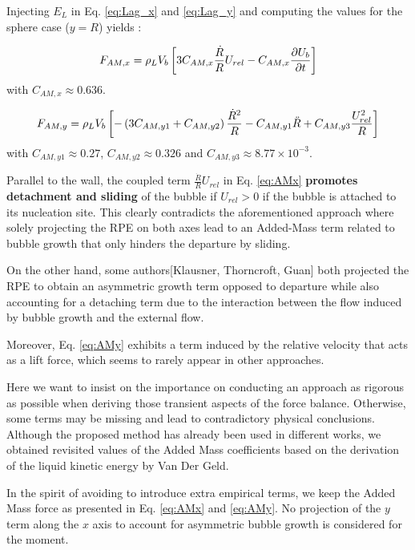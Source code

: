 Injecting $E_{L}$ in Eq. \ref{eq:Lag_x} and \ref{eq:Lag_y} and computing the values for the sphere case ($y=R$) yields :

\begin{align}
\label{eq:AMx}
F_{AM,x}=\rho_{L}V_{b}\left[ 3C_{AM,x}\frac{\dot{R}}{R}U_{rel} - C_{AM,x}\frac{\partial{U_{b}}}{\partial t} \right]
\end{align}
with $C_{AM,x} \approx 0.636$.


\begin{align}
\label{eq:AMy}
F_{AM,y}=\rho_{L}V_{b}\left[ -\left( 3 C_{AM,y1} + C_{AM,y2} \right)\frac{\dot{R}^{2}}{R}-C_{AM,y1}\ddot{R} + C_{AM,y3}\frac{U_{rel}^{2}}{R} \right]
\end{align}
with $C_{AM,y1} \approx 0.27$, $C_{AM,y2}\approx 0.326$ and $C_{AM,y3}\approx 8.77\times  10^{-3}$.


\npar
 
 


Parallel to the wall, the coupled term $\frac{\dot{R}}{R}U_{rel}$ in Eq. \ref{eq:AMx} \textbf{promotes detachment and sliding} of the bubble if $U_{rel}>0$ \eg if the bubble is attached to its nucleation site. This clearly contradicts the aforementioned approach where solely projecting the RPE on both axes lead to an Added-Mass term related to bubble growth that only hinders the departure by sliding. 

On the other hand, some authors[Klausner, Thorncroft, Guan] both projected the RPE to obtain an asymmetric growth term opposed to departure while also accounting for a detaching term due to the interaction between the flow induced by bubble growth and the external flow.

Moreover, Eq. \ref{eq:AMy} exhibits a term induced by the relative velocity that acts as a lift force, which seems to rarely appear in other approaches.

\npar
Here we want to insist on the importance on conducting an approach as rigorous as possible when deriving those transient aspects of the force balance. Otherwise, some terms may be missing and lead to contradictory physical conclusions. Although the proposed method has already been used in different works, we obtained revisited values of the Added Mass coefficients based on the derivation of the liquid kinetic energy by Van Der Geld.

In the spirit of avoiding to introduce extra empirical terms, we keep the Added Mass force as presented in Eq. \ref{eq:AMx} and \ref{eq:AMy}. No projection of the $y$ term along the $x$ axis to account for asymmetric bubble growth is considered for the moment.


